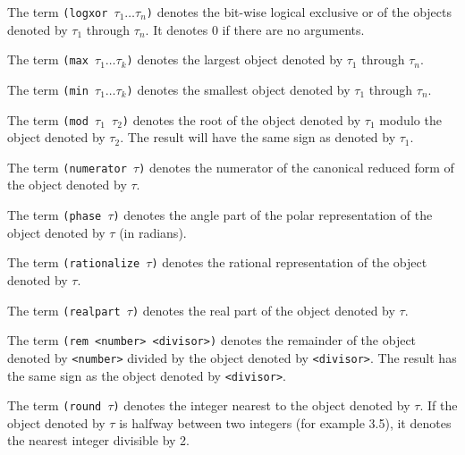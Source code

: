 {The term {\tt (logxor $\tau_1 \ldots \tau_n$)} denotes the bit-wise logical exclusive or of
the objects denoted by $\tau_1$ through $\tau_n$. It denotes 0 if there are no arguments.}



{The term {\tt (max $\tau_1 \ldots \tau_k$)} denotes the largest object
denoted by $\tau_1$ through $\tau_n$.}



{The term {\tt (min $\tau_1 \ldots \tau_k$)} denotes the smallest
object denoted by $\tau_1$ through $\tau_n$.}



{The term {\tt (mod $\tau_1$ $\tau_2$)} denotes the root of the object
denoted by $\tau_1$ modulo the object denoted by $\tau_2$.
The result will have the same sign as denoted by $\tau_1$.}



{The term {\tt (numerator $\tau$)} denotes the numerator of the canonical reduced form of
the object denoted by $\tau$.}



{The term {\tt (phase $\tau$)} denotes the angle part of the polar representation of 
the object denoted by $\tau$ (in radians).}



{The term {\tt (rationalize $\tau$)} denotes the rational representation of the object
denoted by $\tau$.}



{The term {\tt (realpart $\tau$)} denotes the real part of the object denoted by $\tau$.}



{The term {\tt (rem <number> <divisor>)} denotes the remainder of the object denoted by
{\tt <number>} divided by the object denoted by {\tt <divisor>}. The result has
the same sign as the object denoted by {\tt <divisor>}.}



{The term {\tt (round $\tau$)} denotes the integer nearest to the object denoted by $\tau$.
If the object denoted by $\tau$ is halfway between two integers (for example 3.5),
it denotes the nearest integer divisible by 2.}



